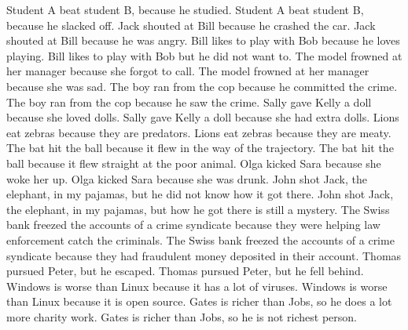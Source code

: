 \documentclass{article}
\begin{document}
\begin{enumerate}
Student A beat student B, because he studied.
Student A beat student B, because he slacked off.
Jack shouted at Bill because he crashed the car.
Jack shouted at Bill because he was angry.
Bill likes to play with Bob because he loves playing.
Bill likes to play with Bob but he did not want to.
The model frowned at her manager because she forgot to call.
The model frowned at her manager because she was sad.
The boy ran from the cop because he committed the crime.
The boy ran from the cop because he saw the crime.
Sally gave Kelly a doll because she loved dolls.
Sally gave Kelly a doll because she had extra dolls.
Lions eat zebras because they are predators.
Lions eat zebras because they are meaty.
The bat hit the ball because it flew in the way of the trajectory.
The bat hit the ball because it flew straight at the poor animal.
Olga kicked Sara because she woke her up.
Olga kicked Sara because she was drunk.
John shot Jack, the elephant, in my pajamas, but he did not know how it got there.
John shot Jack, the elephant, in my pajamas, but how he got there is still a mystery.
The Swiss bank freezed the accounts of a crime syndicate because they were helping law enforcement catch the criminals.
The Swiss bank freezed the accounts of a crime syndicate because they had fraudulent money deposited in their account.
Thomas pursued Peter, but he escaped.
Thomas pursued Peter, but he fell behind.
Windows is worse than Linux because it has a lot of viruses.
Windows is worse than Linux because it is open source.
Gates is richer than Jobs, so he does a lot more charity work.
Gates is richer than Jobs, so he is not richest person.
\end{enumerate}
\end{document}
